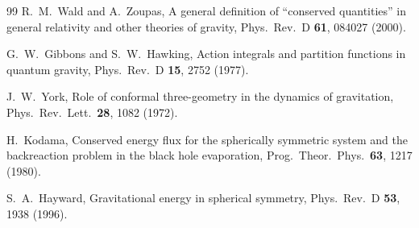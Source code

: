 \documentclass[
  reprint,
  amsmath,amssymb,
  aps,
  prd,
  superscriptaddress,
  nofootinbib,
  longbibliography
]{revtex4-2}
\begin{document}
\begin{thebibliography}{99}
R.~M.~Wald and A.~Zoupas,
\newblock A general definition of ``conserved quantities'' in general relativity and other theories of gravity,
\newblock Phys.\ Rev.\ D \textbf{61}, 084027 (2000).

G.~W.~Gibbons and S.~W.~Hawking,
\newblock Action integrals and partition functions in quantum gravity,
\newblock Phys.\ Rev.\ D \textbf{15}, 2752 (1977).

J.~W.~York,
\newblock Role of conformal three-geometry in the dynamics of gravitation,
\newblock Phys.\ Rev.\ Lett.\ \textbf{28}, 1082 (1972).

H.~Kodama,
\newblock Conserved energy flux for the spherically symmetric system and the backreaction problem in the black hole evaporation,
\newblock Prog.\ Theor.\ Phys.\ \textbf{63}, 1217 (1980).

S.~A.~Hayward,
\newblock Gravitational energy in spherical symmetry,
\newblock Phys.\ Rev.\ D \textbf{53}, 1938 (1996).

\end{thebibliography}
\end{document}
